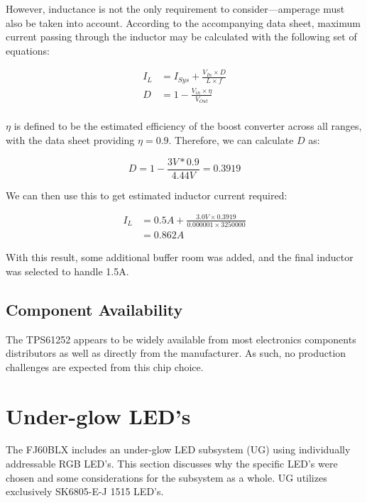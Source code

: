 \documentclass[11pt]{article}
\begin{document}
However, inductance is not the only requirement to consider—amperage must also be taken into account. According to the accompanying data sheet, maximum current passing through the inductor may be calculated with the following set of equations:

\begin{equation}
\begin{aligned}
	I_L &= I_{Sys} + \frac{V_{In} \times D}{L \times f} \\
	D &= 1 - \frac{V_{in} \times \eta}{V_{Out}} \\
\end{aligned}
\end{equation}

$\eta$ is defined to be the estimated efficiency of the boost converter across all ranges, with the data sheet providing $\eta = 0.9$. Therefore, we can calculate $D$ as:

$$ D = 1 - \frac{3V * 0.9}{4.44V} = 0.3919 $$

We can then use this to get estimated inductor current required:

\begin{equation}
\begin{aligned}
	I_L &= 0.5A + \frac{3.0V \times 0.3919}{0.000001 \times 3250000} \\
	&= 0.862A
\end{aligned}	
\end{equation}

With this result, some additional buffer room was added, and the final inductor was selected to handle 1.5A. 

\subsection{Component Availability}

The TPS61252 appears to be widely available from most electronics components distributors as well as directly from the manufacturer. As such, no production challenges are expected from this chip choice.

\section{Under-glow LED's}

The FJ60BLX includes an under-glow LED subsystem (UG)\footnotemark {} using individually addressable RGB LED's. This section discusses why the specific LED's were chosen and some considerations for the subsystem as a whole. UG utilizes exclusively SK6805-E-J 1515 LED's.
\end{document}
